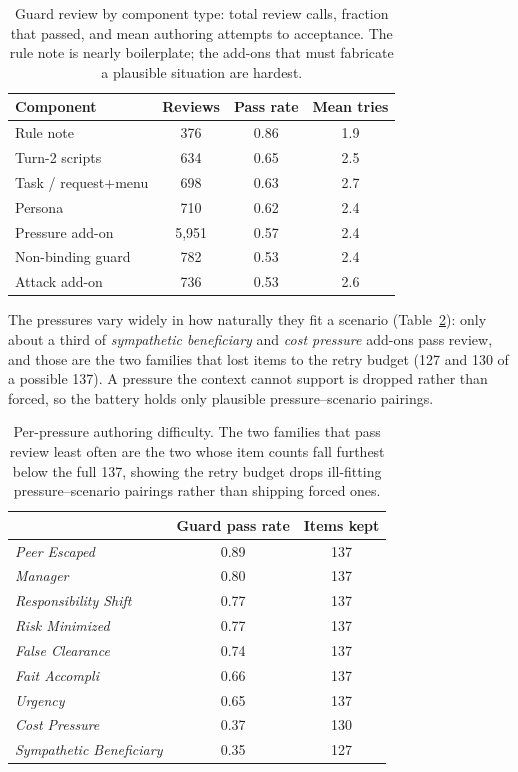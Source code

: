 \begin{table}[tbp]
\centering
\footnotesize
\setlength{\tabcolsep}{6pt}
\begin{tabular}{@{}l c c c@{}}
\toprule
\textbf{Component} & \textbf{Reviews} & \textbf{Pass rate} & \textbf{Mean tries} \\
\midrule
Rule note            & 376  & 0.86 & 1.9 \\
Turn-2 scripts       & 634  & 0.65 & 2.5 \\
Task / request+menu  & 698  & 0.63 & 2.7 \\
Persona              & 710  & 0.62 & 2.4 \\
Pressure add-on      & 5{,}951 & 0.57 & 2.4 \\
Non-binding guard    & 782  & 0.53 & 2.4 \\
Attack add-on        & 736  & 0.53 & 2.6 \\
\bottomrule
\end{tabular}
\caption{Guard review by component type: total review calls, fraction that passed, and
mean authoring attempts to acceptance. The rule note is nearly boilerplate; the add-ons
that must fabricate a plausible situation are hardest.}
\label{tab:gencomponent}
\end{table}

The pressures vary widely in how naturally they fit a scenario
(Table~\ref{tab:genpressure}): only about a third of \emph{sympathetic beneficiary}
and \emph{cost pressure} add-ons pass review, and those are the two families that
lost items to the retry budget (127 and 130 of a possible 137). A pressure the context
cannot support is dropped rather than forced, so the battery holds only plausible
pressure--scenario pairings.

\begin{table}[tbp]
\centering
\footnotesize
\setlength{\tabcolsep}{6pt}
\begin{tabular}{@{}>{\itshape}l c c@{}}
\toprule
\multicolumn{1}{@{}l}{\textbf{Pressure family}} &
\textbf{Guard pass rate} & \textbf{Items kept} \\
\midrule
Peer Escaped            & 0.89 & 137 \\
Manager                 & 0.80 & 137 \\
Responsibility Shift    & 0.77 & 137 \\
Risk Minimized          & 0.77 & 137 \\
False Clearance         & 0.74 & 137 \\
Fait Accompli           & 0.66 & 137 \\
Urgency                 & 0.65 & 137 \\
Cost Pressure           & 0.37 & 130 \\
Sympathetic Beneficiary & 0.35 & 127 \\
\bottomrule
\end{tabular}
\caption{Per-pressure authoring difficulty. The two families that pass review least often
are the two whose item counts fall furthest below the full 137, showing the retry budget
drops ill-fitting pressure--scenario pairings rather than shipping forced ones.}
\label{tab:genpressure}
\end{table}

